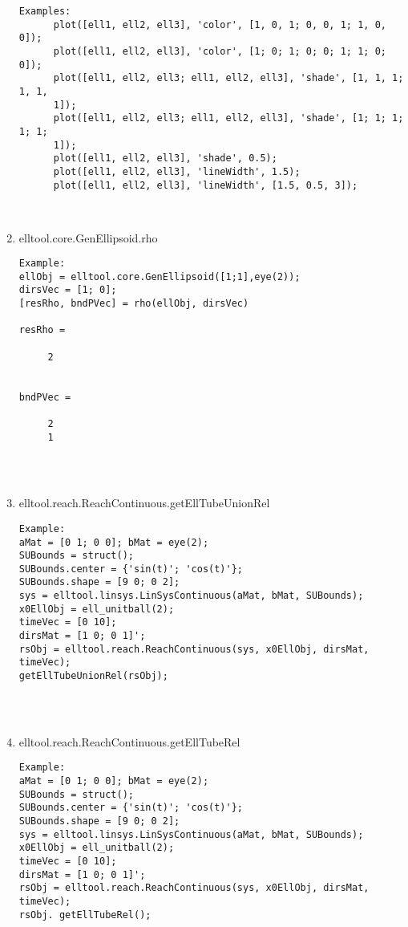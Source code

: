 \begin{enumerate}
\begin{lstlisting}
Examples:
      plot([ell1, ell2, ell3], 'color', [1, 0, 1; 0, 0, 1; 1, 0, 0]);
      plot([ell1, ell2, ell3], 'color', [1; 0; 1; 0; 0; 1; 1; 0; 0]);
      plot([ell1, ell2, ell3; ell1, ell2, ell3], 'shade', [1, 1, 1; 1, 1,
      1]);
      plot([ell1, ell2, ell3; ell1, ell2, ell3], 'shade', [1; 1; 1; 1; 1;
      1]);
      plot([ell1, ell2, ell3], 'shade', 0.5);
      plot([ell1, ell2, ell3], 'lineWidth', 1.5);
      plot([ell1, ell2, ell3], 'lineWidth', [1.5, 0.5, 3]);



\end{lstlisting}
\fontfamily{\familydefault}
\selectfont
\item {elltool.core.GenEllipsoid.rho}
\selectfont
\begin{lstlisting}
Example:
ellObj = elltool.core.GenEllipsoid([1;1],eye(2));
dirsVec = [1; 0];
[resRho, bndPVec] = rho(ellObj, dirsVec)

resRho =

     2


bndPVec =

     2
     1




\end{lstlisting}
\fontfamily{\familydefault}
\selectfont
\item {elltool.reach.ReachContinuous.getEllTubeUnionRel}
\selectfont
\begin{lstlisting}
Example:
aMat = [0 1; 0 0]; bMat = eye(2);
SUBounds = struct();
SUBounds.center = {'sin(t)'; 'cos(t)'};
SUBounds.shape = [9 0; 0 2];
sys = elltool.linsys.LinSysContinuous(aMat, bMat, SUBounds);
x0EllObj = ell_unitball(2);
timeVec = [0 10];
dirsMat = [1 0; 0 1]';
rsObj = elltool.reach.ReachContinuous(sys, x0EllObj, dirsMat, timeVec);
getEllTubeUnionRel(rsObj);




\end{lstlisting}
\fontfamily{\familydefault}
\selectfont
\item {elltool.reach.ReachContinuous.getEllTubeRel}
\selectfont
\begin{lstlisting}
Example:
aMat = [0 1; 0 0]; bMat = eye(2);
SUBounds = struct();
SUBounds.center = {'sin(t)'; 'cos(t)'};
SUBounds.shape = [9 0; 0 2];
sys = elltool.linsys.LinSysContinuous(aMat, bMat, SUBounds);
x0EllObj = ell_unitball(2);
timeVec = [0 10];
dirsMat = [1 0; 0 1]';
rsObj = elltool.reach.ReachContinuous(sys, x0EllObj, dirsMat, timeVec);
rsObj. getEllTubeRel();





\end{lstlisting}
\end{enumerate}
